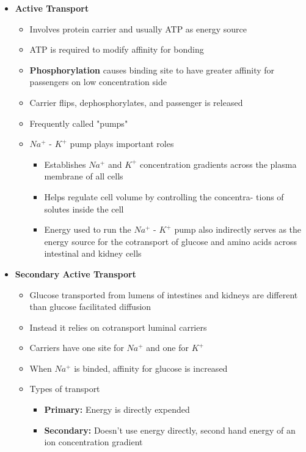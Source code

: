 \documentclass[11pt]{article}
\begin{document}
\begin{itemize}
\begin{itemize}
\item \textbf{Active Transport}
\begin{itemize}
\item Involves protein carrier and usually ATP as energy source
\item ATP is required to modify affinity for bonding
\item \textbf{Phosphorylation} causes binding site to have greater affinity for passengers on low concentration side
\item Carrier flips, dephosphorylates, and passenger is released
\item Frequently called "pumps"
\item $Na^+$ - $K^+$ pump plays important roles
\begin{itemize}
\item Establishes $Na^+$ and $K^+$ concentration gradients across the plasma membrane of all cells
\item Helps regulate cell volume by controlling the concentra- tions of solutes inside the cell
\item Energy used to run the $Na^+$ - $K^+$  pump also indirectly serves as the energy source for the cotransport of glucose and amino acids across intestinal and kidney cells
\end{itemize}
\end{itemize}

\item \textbf{Secondary Active Transport}
\begin{itemize}
\item Glucose transported from lumens of intestines and kidneys are different than glucose facilitated diffusion
\item Instead it relies on cotransport luminal carriers
\item Carriers have one site for $Na^+$ and one for $K^+$
\item When $Na^+$ is binded, affinity for glucose is increased
\item Types of transport
\begin{itemize}
\item \textbf{Primary:} Energy is directly expended
\item \textbf{Secondary:} Doesn't use energy directly, second hand energy   of an ion concentration gradient
\end{itemize}
\end{itemize}
\end{itemize}



\end{itemize}
\end{document}
